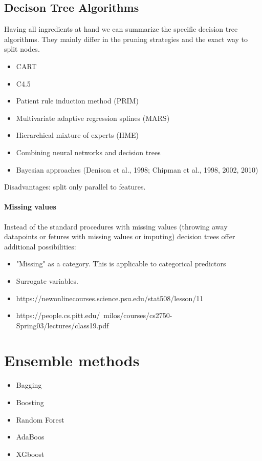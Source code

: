 \documentclass[12pt,a4paper]{article}
\begin{document}
\subsection{Decison Tree Algorithms}
Having all ingredients at hand we can summarize the specific decision tree algorithms. They mainly differ in the pruning strategies and the exact way to split nodes.
\begin{itemize}\itemsep0em 
	\item CART
	\item C4.5
	\item Patient rule induction method (PRIM)
	\item Multivariate adaptive regression splines (MARS)
	\item Hierarchical mixture of experts (HME)
	\item Combining neural networks and decision trees \cite{DBLP:journals/corr/abs-1711-09784}
	\item Bayesian approaches (Denison et al., 1998; Chipman et al., 1998, 2002, 2010)
\end{itemize}
Disadvantages: split only parallel to features.
\paragraph{Missing values}
Instead of the standard procedures with missing values (throwing away datapoints or fetures with missing values or imputing) decision trees offer additional possibilities:
\begin{itemize}
	\item "Missing" as a category. This is applicable to categorical predictors
	\item Surrogate variables.
	\item https://newonlinecourses.science.psu.edu/stat508/lesson/11
	\item https://people.cs.pitt.edu/~milos/courses/cs2750-Spring03/lectures/class19.pdf
	
\end{itemize}
\section{Ensemble methods}
\begin{itemize}\itemsep0em 
	\item Bagging
	\item Boosting
	\item Random Forest
	\item AdaBoos
	\item XGboost	
\end{itemize}
\end{document}
